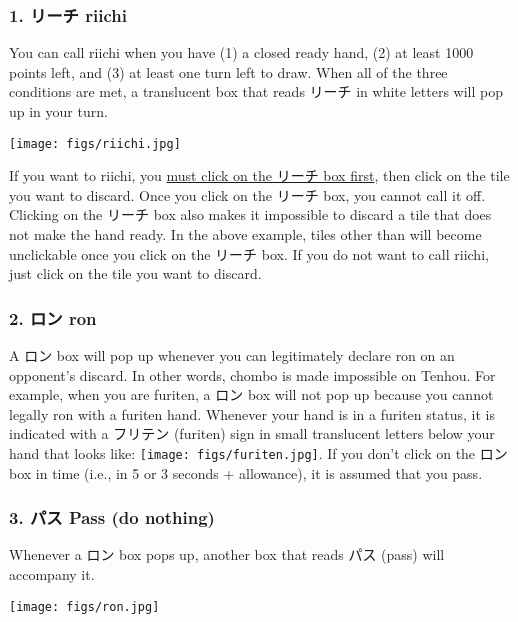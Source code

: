 \subsubsection{1. リーチ riichi } 
You can call riichi when you have (1) a closed ready hand, (2) at least 1000 points left, and (3) at least one turn left to draw. When all of the three conditions are met, a translucent box that reads リーチ in white letters will pop up in your turn. 
\begin{center}
\vspace{2mm}
\texttt{[image: figs/riichi.jpg]}
\end{center}
If you want to riichi, you \underline{must click on the リーチ box first}, then click on the tile you want to discard. Once you click on the リーチ box, you cannot call it off. Clicking on the リーチ box also makes it impossible to discard a tile that does not make the hand ready. In the above example, tiles other than {\LARGE {}} will become unclickable once you click on the リーチ box. If you do not want to call riichi, just click on the tile you want to discard. 

\subsubsection{2. ロン {\jap ron} \textipa{[r\'\textopeno\ng]}}
A ロン box will pop up whenever you can legitimately declare {\jap ron} on an opponent's discard. In other words, {\jap chombo} is made impossible on {\jap Tenhou}. For example, when you are {\jap furiten}, a ロン box will not pop up because you cannot legally {\jap ron} with a {\jap furiten} hand. Whenever your hand is in a {\jap furiten} status, it is indicated with a フリテン ({\jap furiten}) sign in small translucent letters below your hand that looks like: \texttt{[image: figs/furiten.jpg]}.
If you don't click on the ロン box in time (i.e., in 5 or 3 seconds + allowance), it is assumed that you pass. 

\subsubsection{3. パス Pass (do nothing)}
Whenever a ロン box pops up, another box that reads パス (pass) will accompany it. 
\begin{center}
\texttt{[image: figs/ron.jpg]}
\end{center}

